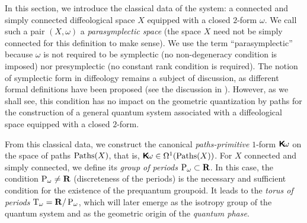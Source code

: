 \documentclass[10pt,reqno,letterpaper,twoside]{amsbook}
\begin{document}
  In this section,
  we introduce the classical data of the system:
  a connected and simply connected diffeological space $X$ equipped with a closed $2$-form $\omega$.
  We call such a pair $(X,\omega)$ a \emph{parasymplectic space}
  (the space $X$ need not be simply connected for this definition to make sense).
  We use the term ``parasymplectic'' because $\omega$ is not required to be symplectic
  (no non-degeneracy condition is imposed)
  nor presymplectic (no constant rank condition is required).
  The notion of symplectic form in diffeology remains a subject of discussion,
  as different formal definitions have been proposed
  (see the discussion in \cite{PIZ10}).
  However,
  as we shall see,
  this condition has no impact on the geometric quantization by paths
  for the construction of a general quantum system associated with a diffeological space equipped with a closed $2$-form.
  
  From this classical data,
  we construct the canonical \emph{paths-primitive} $1$-form $\boldsymbol{\mathsf{K}}\!\omega$ on the space of paths $\operatorname{Paths}(X)$,
  that is,
  $\boldsymbol{\mathsf{K}}\!\omega \in\Omega^1(\operatorname{Paths}(X))$.
  For $X$ connected and simply connected,
  we define its \emph{group of periods} $\operatorname{P}_\omega \subset {\mathbf{R}}$.
  In this case,
  the condition $\operatorname{P}_\omega \neq {\mathbf{R}}$ (discreteness of the periods)
  is the necessary and sufficient condition for the existence of the prequantum groupoid.
  It leads to the \emph{torus of periods} $\mathrm{T}_\omega = {\mathbf{R}}/\operatorname{P}_\omega$,
  which will later emerge as the isotropy group of the quantum system
  and as the geometric origin of the \emph{quantum phase}.
  
\end{document}
